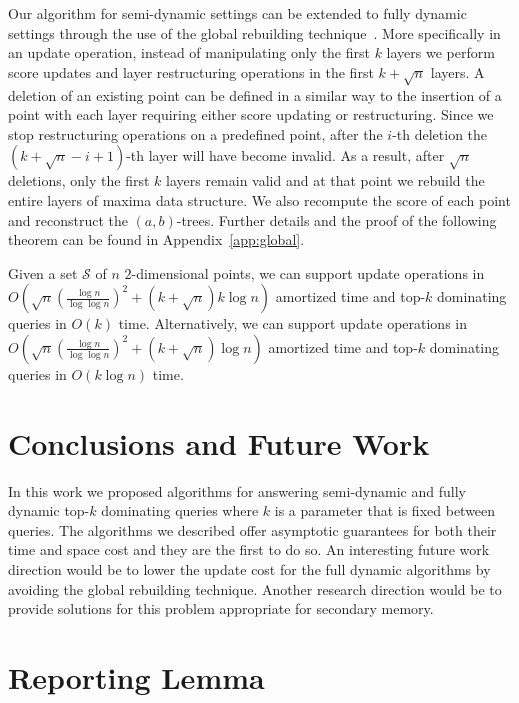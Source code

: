 \documentclass{llncs}
\begin{document}
Our algorithm for semi-dynamic settings can be extended to fully dynamic settings through the use of the global rebuilding technique~\cite{OvermarsL81}. More specifically in an update operation, instead of manipulating only the first $k$ layers we perform score updates and layer restructuring operations in the first $k+\sqrt{n}$ layers. A deletion of an existing point can be defined in a similar way to the insertion of a point with each layer requiring either score updating or restructuring. Since we stop restructuring operations on a predefined point, after the $i$-th deletion the $(k+\sqrt{n}-i+1)$-th layer will have become invalid. As a result, after $\sqrt{n}$ deletions, only the first $k$ layers remain valid and at that point we rebuild the entire layers of maxima data structure. We also recompute the score of each point and reconstruct the $(a,b)$-trees. Further details and the proof of the following theorem can be found in Appendix~\ref{app:global}.


\begin{theorem} \label{thm:fd}
Given a set $\mathcal{S}$ of $n$ $2$-dimensional points, we can support update operations in $O(\sqrt{n}(\frac{\log n}{\log\log n})^{2}+(k+\sqrt{n})k\log n)$ amortized time and top-$k$ dominating queries in $O(k)$ time. Alternatively, we can support update operations in $O(\sqrt{n}(\frac{\log n}{\log\log n})^{2}+(k+\sqrt{n})\log n)$ amortized time and top-$k$ dominating queries in $O(k\log n)$ time.
\end{theorem}


\section{Conclusions and Future Work} \label{section:ConclusionsFutureWork}
In this work we proposed algorithms for answering semi-dynamic and fully dynamic top-$k$ dominating queries where $k$ is a parameter that is fixed between queries. The algorithms we described offer asymptotic guarantees for both their time and space cost and they are the first to do so. An interesting future work direction would be to lower the update cost for the full dynamic algorithms by avoiding the global rebuilding technique. Another research direction would be to provide solutions for this problem appropriate for secondary memory.





\newpage
\appendix

\section{Reporting Lemma}
\end{document}
